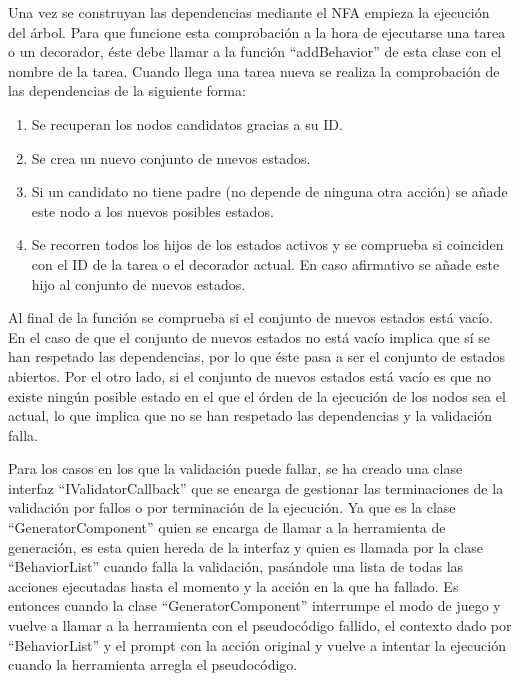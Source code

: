Una vez se construyan las dependencias mediante el NFA empieza la ejecución del árbol.
Para que funcione esta comprobación a la hora de ejecutarse una tarea o un decorador, éste debe llamar a la función ``addBehavior'' de esta clase con el nombre de la tarea.
Cuando llega una tarea nueva se realiza la comprobación de las dependencias de la siguiente forma:

\begin{enumerate}
    \item Se recuperan los nodos candidatos gracias a su ID.
    \item Se crea un nuevo conjunto de nuevos estados.
    \item Si un candidato no tiene padre (no depende de ninguna otra acción) se añade este nodo a los nuevos posibles estados.
    \item Se recorren todos los hijos de los estados activos y se comprueba si coinciden con el ID de la tarea o el decorador actual. En caso afirmativo se añade este hijo al conjunto de nuevos estados.
\end{enumerate}

Al final de la función se comprueba si el conjunto de nuevos estados está vacío.
En el caso de que el conjunto de nuevos estados no está vacío implica que sí se han respetado las dependencias, por lo que éste pasa a ser el conjunto de estados abiertos.
Por el otro lado, si el conjunto de nuevos estados está vacío es que no existe ningún posible estado en el que el órden de la ejecución de los nodos sea el actual, lo que implica que no se han respetado las dependencias y la validación falla.

Para los casos en los que la validación puede fallar, se ha creado una clase interfaz ``IValidatorCallback'' que se encarga de gestionar las terminaciones de la validación por fallos o por terminación de la ejecución.
Ya que es la clase ``GeneratorComponent'' quien se encarga de llamar a la herramienta de generación, es esta quien hereda de la interfaz y quien es llamada por la clase ``BehaviorList'' cuando falla la validación, pasándole una lista de todas las acciones ejecutadas hasta el momento y la acción en la que ha fallado.
Es entonces cuando la clase ``GeneratorComponent'' interrumpe el modo de juego y vuelve a llamar a la herramienta con el pseudocódigo fallido, el contexto dado por ``BehaviorList'' y el prompt con la acción original y vuelve a intentar la ejecución cuando la herramienta arregla el pseudocódigo.

